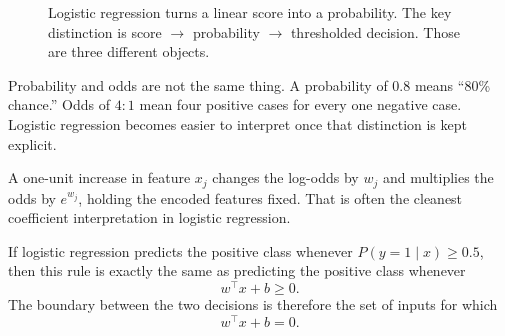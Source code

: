 \begin{figure}[t]
\centering
{}
\caption{Logistic regression turns a linear score into a probability. The key distinction is score $\rightarrow$ probability $\rightarrow$ thresholded decision. Those are three different objects.}
\label{fig:sigmoid-curve}
\end{figure}

\begin{warningbox}
Probability and odds are not the same thing. A probability of $0.8$ means ``80\% chance.'' Odds of $4{:}1$ mean four positive cases for every one negative case. Logistic regression becomes easier to interpret once that distinction is kept explicit.
\end{warningbox}

\begin{practicalnote}
A one-unit increase in feature $x_j$ changes the log-odds by $w_j$ and multiplies the odds by $e^{w_j}$, holding the encoded features fixed. That is often the cleanest coefficient interpretation in logistic regression.
\end{practicalnote}

\begin{theorem}
If logistic regression predicts the positive class whenever $P(y=1 \mid x) \ge 0.5$, then this rule is exactly the same as predicting the positive class whenever
\[
w^\top x + b \ge 0.
\]
The boundary between the two decisions is therefore the set of inputs for which
\[
w^\top x + b = 0.
\]
\end{theorem}


